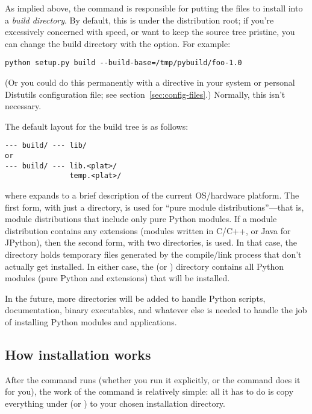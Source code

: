 \documentclass{howto}
\begin{document}
As implied above, the  command is responsible for putting
the files to install into a \emph{build directory}.  By default, this is
 under the distribution root; if you're excessively
concerned with speed, or want to keep the source tree pristine, you can
change the build directory with the  option.  For
example:
\begin{verbatim}
python setup.py build --build-base=/tmp/pybuild/foo-1.0
\end{verbatim}
(Or you could do this permanently with a directive in your system or
personal Distutils configuration file; see
section~\ref{sec:config-files}.)  Normally, this isn't necessary.

The default layout for the build tree is as follows:
\begin{verbatim}
--- build/ --- lib/
or
--- build/ --- lib.<plat>/
               temp.<plat>/
\end{verbatim}
where  expands to a brief description of the current
OS/hardware platform.  The first form, with just a  directory,
is used for ``pure module distributions''---that is, module
distributions that include only pure Python modules.  If a module
distribution contains any extensions (modules written in C/C++, or Java
for JPython), then the second form, with two  directories,
is used.  In that case, the  directory holds
temporary files generated by the compile/link process that don't
actually get installed.  In either case, the  (or
) directory contains all Python modules (pure
Python and extensions) that will be installed.

In the future, more directories will be added to handle Python scripts,
documentation, binary executables, and whatever else is needed to handle
the job of installing Python modules and applications.


\subsection{How installation works}

After the  command runs (whether you run it explicitly,
or the  command does it for you), the work of the
 command is relatively simple: all it has to do is copy
everything under  (or )
to your chosen installation directory.
\end{document}
